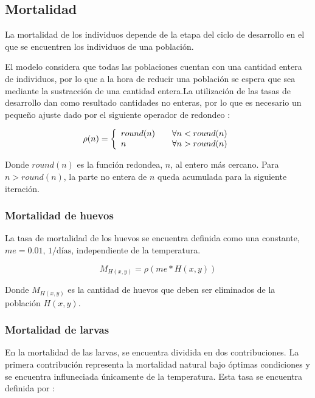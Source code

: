 \subsection{Mortalidad}
\label{subsec:cap4-mortalidad}
La mortalidad de los individuos depende de la etapa del ciclo de desarrollo en el que se encuentren
los individuos de una población.

El modelo considera que todas las poblaciones cuentan con una cantidad entera de individuos, por
lo que a la hora de reducir una población se espera que sea mediante la sustracción de una
cantidad entera.La utilización de las tasas de desarrollo dan como resultado cantidades no enteras, por lo que es necesario un pequeño ajuste dado por el siguiente operador de redondeo :

\begin{equation}
\label{eq:operador-redondeo}
\rho(n) = \left\{
\begin{array}{l l}
   round(n) & \quad  \forall n < round(n)\\
   n & \quad  \forall n > round(n)\\
\end{array} \right.
\end{equation}

Donde $round(n)$ es la función redondea, $n$, al entero más cercano. Para $n > round(n)$, la parte
no entera de $n$ queda acumulada para la siguiente iteración.

\subsubsection{Mortalidad de huevos}
La tasa de mortalidad de los huevos se encuentra definida como una constante, $me = 0.01$,
$1/\text{días}$, independiente de la temperatura\citep{otero2006stochastic}.

\begin{equation}
    M_{H(x,y)} = \rho(me * H(x,y))
\end{equation}

Donde $M_{H(x,y)}$ es la cantidad de huevos que deben ser eliminados de la población $H(x,y)$.

\subsubsection{Mortalidad de larvas}
En \citet{otero2006stochastic} la mortalidad de las larvas, se encuentra dividida en dos
contribuciones. La primera contribución representa la mortalidad natural bajo óptimas condiciones
y se encuentra influneciada únicamente de la temperatura. Esta tasa se encuentra definida por :

